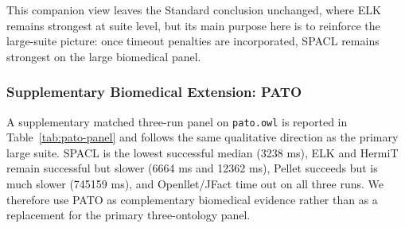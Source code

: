 \documentclass[preprint,12pt,times]{elsarticle}
\begin{document}
\begin{table}[htbp]
\centering
\caption{Suite-Level Failure-Aware CEW Summary (3 clean runs; lower is better)}
\label{tab:cew-summary}
\end{table}

This companion view leaves the Standard conclusion unchanged, where ELK remains strongest at suite level, but its main purpose here is to reinforce the large-suite picture: once timeout penalties are incorporated, SPACL remains strongest on the large biomedical panel.

\subsubsection{Supplementary Biomedical Extension: PATO}
\label{sec:pato-panel}

A supplementary matched three-run panel on \texttt{pato.owl} is reported in Table~\ref{tab:pato-panel} and follows the same qualitative direction as the primary large suite. SPACL is the lowest successful median (3238 ms), ELK and HermiT remain successful but slower (6664 ms and 12362 ms), Pellet succeeds but is much slower (745159 ms), and Openllet/JFact time out on all three runs. We therefore use PATO as complementary biomedical evidence rather than as a replacement for the primary three-ontology panel.
\end{document}
